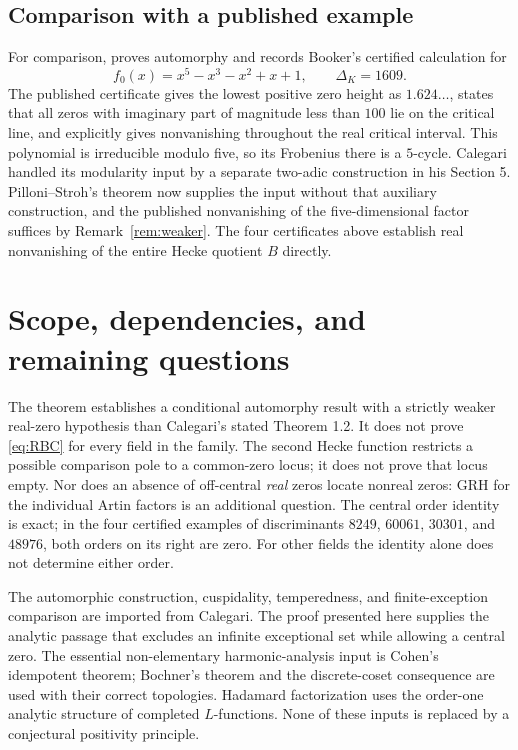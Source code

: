 \documentclass[11pt]{article}
\theoremstyle{definition}
\theoremstyle{remark}
\numberwithin{equation}{section}
\begin{document}
\subsection{Comparison with a published example}

For comparison, \citet[Theorems 5.1 and 5.3]{calegari} proves automorphy and records Booker's certified calculation for
\[
f_0(x)=x^5-x^3-x^2+x+1,\qquad\Delta_K=1609.
\]
The published certificate gives the lowest positive zero height as $1.624\ldots$, states that all zeros with imaginary part of magnitude less than $100$ lie on the critical line, and explicitly gives nonvanishing throughout the real critical interval. This polynomial is irreducible modulo five, so its Frobenius there is a $5$-cycle. Calegari handled its modularity input by a separate two-adic construction in his Section 5. Pilloni--Stroh's theorem now supplies the input without that auxiliary construction, and the published nonvanishing of the five-dimensional factor suffices by Remark~\ref{rem:weaker}. The four certificates above establish real nonvanishing of the entire Hecke quotient $B$ directly.

\section{Scope, dependencies, and remaining questions}

The theorem establishes a conditional automorphy result with a strictly weaker real-zero hypothesis than Calegari's stated Theorem 1.2. It does not prove \eqref{eq:RBC} for every field in the family. The second Hecke function restricts a possible comparison pole to a common-zero locus; it does not prove that locus empty. Nor does an absence of off-central \emph{real} zeros locate nonreal zeros: GRH for the individual Artin factors is an additional question. The central order identity is exact; in the four certified examples of discriminants $8249$, $60061$, $30301$, and $48976$, both orders on its right are zero. For other fields the identity alone does not determine either order.

The automorphic construction, cuspidality, temperedness, and finite-exception comparison are imported from Calegari. The proof presented here supplies the analytic passage that excludes an infinite exceptional set while allowing a central zero. The essential non-elementary harmonic-analysis input is Cohen's idempotent theorem; Bochner's theorem and the discrete-coset consequence are used with their correct topologies. Hadamard factorization uses the order-one analytic structure of completed $L$-functions. None of these inputs is replaced by a conjectural positivity principle.
\end{document}
